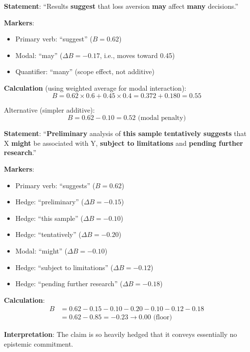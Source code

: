 \documentclass[11pt,a4paper]{article}
\theoremstyle{remark}
\begin{document}
\begin{calculationbox}[title={Example 2: Moderate Claim}]
\textbf{Statement}: ``Results \textbf{suggest} that loss aversion \textbf{may} affect \textbf{many} decisions.''

\textbf{Markers}:
\begin{itemize}
    \item Primary verb: ``suggest'' ($B = 0.62$)
    \item Modal: ``may'' ($\Delta B = -0.17$, i.e., moves toward 0.45)
    \item Quantifier: ``many'' (scope effect, not additive)
\end{itemize}

\textbf{Calculation} (using weighted average for modal interaction):
\begin{equation}
B = 0.62 \times 0.6 + 0.45 \times 0.4 = 0.372 + 0.180 = 0.55
\end{equation}

Alternative (simpler additive):
\begin{equation}
B = 0.62 - 0.10 = 0.52 \text{ (modal penalty)}
\end{equation}
\end{calculationbox}

\begin{calculationbox}[title={Example 3: Heavily Hedged Claim}]
\textbf{Statement}: ``\textbf{Preliminary} analysis of \textbf{this sample} \textbf{tentatively suggests} that X \textbf{might} be associated with Y, \textbf{subject to limitations} and \textbf{pending further research}.''

\textbf{Markers}:
\begin{itemize}
    \item Primary verb: ``suggests'' ($B = 0.62$)
    \item Hedge: ``preliminary'' ($\Delta B = -0.15$)
    \item Hedge: ``this sample'' ($\Delta B = -0.10$)
    \item Hedge: ``tentatively'' ($\Delta B = -0.20$)
    \item Modal: ``might'' ($\Delta B = -0.10$)
    \item Hedge: ``subject to limitations'' ($\Delta B = -0.12$)
    \item Hedge: ``pending further research'' ($\Delta B = -0.18$)
\end{itemize}

\textbf{Calculation}:
\begin{align}
B &= 0.62 - 0.15 - 0.10 - 0.20 - 0.10 - 0.12 - 0.18 \\
&= 0.62 - 0.85 = -0.23 \to 0.00 \text{ (floor)}
\end{align}

\textbf{Interpretation}: The claim is so heavily hedged that it conveys essentially no epistemic commitment.
\end{calculationbox}
\end{document}

